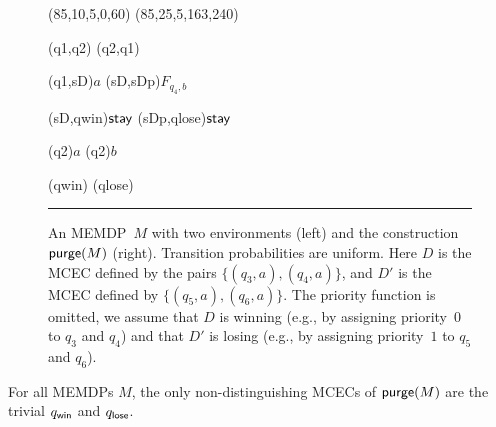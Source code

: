 \documentclass[a4paper,USenglish,cleveref, autoref, thm-restate]{lipics-v2021}
\def\loseabsorb{q_{\sf lose}}
\def\winabsorb{q_{\sf win}}
\newcommand\purge[1]{\textrm{\sf purge}(#1)}
\def\actionstay{\textrm{\sf stay}}
\begin{document}
\begin{figure}[!t]
\begin{gpicture}
\drawarc[linegray=0](85,10,5,0,60)       \drawarc[linegray=0](85,25,5,163,240)    






\drawedge[ELside=l,ELpos=50, ELdist=1, curvedepth=-3](q1,q2){}
\drawedge[ELside=l,ELpos=50, ELdist=1, curvedepth=-3](q2,q1){}



\drawedge[ELside=r, ELpos=30, ELdist=1](q1,sD){$a$}
\drawedge[ELside=r, ELpos=40, ELdist=1](sD,sDp){$F_{q_4,b}$}

\drawedge[ELside=r, ELpos=35, ELdist=1](sD,qwin){$\actionstay$}
\drawedge[ELside=r, ELpos=35, ELdist=1](sDp,qlose){$\actionstay$}




\drawloop[ELside=l, ELpos=25, ELdist=.5,loopCW=y, loopangle=135](q2){$a$}
\drawloop[ELside=r, ELpos=25, ELdist=.5,loopCW=n, loopangle=45](q2){$b$}




\drawloop[ELside=l,loopCW=y, loopangle=0](qwin){}
\drawloop[ELside=l,loopCW=y, loopangle=0](qlose){}











\end{gpicture}

 \hrule
   \caption{
    An MEMDP~$M$ with two environments (left) and the construction $\purge{M}$ (right).
    Transition probabilities are uniform.
    Here $D$ is the MCEC defined by the pairs $\{(q_3,a), (q_4,a)\}$, and $D'$ is the MCEC defined by
    $\{(q_5,a), (q_6,a)\}$. The priority function is omitted, we assume that $D$ is winning (e.g., by assigning priority~$0$ to $q_3$ and $q_4$) and that $D'$ is losing (e.g., by assigning priority~$1$ to $q_5$ and $q_6$).  \label{fig:removing-nondist-cec}
  }
\end{figure}

\begin{lemma}
  \label{lemma:removing-nondist-cecs-1}
  For all MEMDPs $M$, the only non-distinguishing MCECs of $\purge{M}$ are the trivial $\winabsorb$ and $\loseabsorb$.
\end{lemma}
\end{document}
